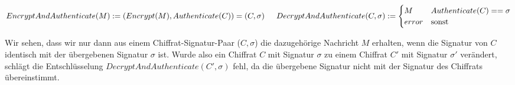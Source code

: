 \begin{math}
	EncryptAndAuthenticate(M) := (Encrypt(M), Authenticate(C)) = (C, \sigma) \\
	\\
	\indent DecryptAndAuthenticate(C, \sigma) := \begin{cases}
		M           & Authenticate(C) == \sigma\\
		error       & \text{sonst}
	\end{cases}
\end{math}
\bigskip

Wir sehen, dass wir nur dann aus einem Chiffrat-Signatur-Paar (\(C, \sigma\)) die dazugehörige Nachricht \(M\) erhalten, wenn die Signatur von \(C\) identisch mit der übergebenen Signatur \(\sigma\) ist. Wurde also ein Chiffrat \(C\) mit Signatur \(\sigma\) zu einem Chiffrat \(C'\) mit Signatur \(\sigma'\) verändert, schlägt die Entschlüsselung \(DecryptAndAuthenticate(C', \sigma)\) fehl, da die übergebene Signatur nicht mit der Signatur des Chiffrats übereinstimmt.

